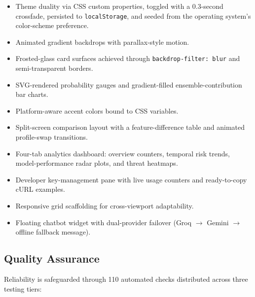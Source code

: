 \documentclass[conference]{IEEEtran}
\begin{document}
\begin{itemize}
    \item Theme duality via CSS custom properties, toggled with a 0.3-second crossfade, persisted to \texttt{localStorage}, and seeded from the operating system's color-scheme preference.
    \item Animated gradient backdrops with parallax-style motion.
    \item Frosted-glass card surfaces achieved through \texttt{backdrop-filter: blur} and semi-transparent borders.
    \item SVG-rendered probability gauges and gradient-filled ensemble-contribution bar charts.
    \item Platform-aware accent colors bound to CSS variables.
    \item Split-screen comparison layout with a feature-difference table and animated profile-swap transitions.
    \item Four-tab analytics dashboard: overview counters, temporal risk trends, model-performance radar plots, and threat heatmaps.
    \item Developer key-management pane with live usage counters and ready-to-copy cURL examples.
    \item Responsive grid scaffolding for cross-viewport adaptability.
    \item Floating chatbot widget with dual-provider failover (Groq $\to$ Gemini $\to$ offline fallback message).
\end{itemize}

\subsection{Quality Assurance}

Reliability is safeguarded through 110 automated checks distributed across three testing tiers:
\end{document}
